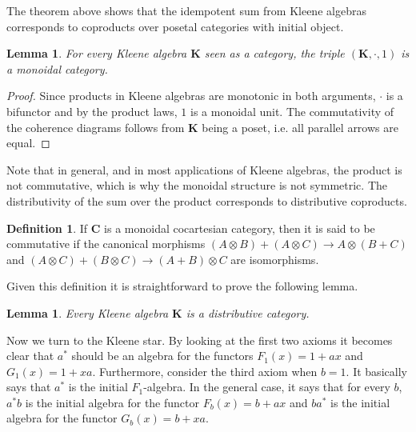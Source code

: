 \documentclass[12pt,a4paper]{article}
\numberwithin{equation}{section}
\newcommand{\cat}{%
\mathbf%
}
\theoremstyle{plain}
\newtheorem{lemma}[theorem]{Lemma}
\theoremstyle{definition}
\newtheorem{definition}[theorem]{Definition}
\begin{document}
The theorem above shows that the idempotent sum from Kleene algebras corresponds to coproducts over posetal categories with initial object.

\begin{lemma}
  For every Kleene algebra $\cat{K}$ seen as a category, the triple $(\cat{K}, \cdot, 1)$ is a monoidal category.
\end{lemma}
\begin{proof}
  Since products in Kleene algebras are monotonic in both arguments, $\cdot$ is a bifunctor and by the product laws, $1$ is a monoidal unit. The commutativity of the coherence diagrams follows from $\cat{K}$ being a poset, i.e. all parallel arrows are equal.
\end{proof}

Note that in general, and in most applications of Kleene algebras, the product is not commutative, which is why the monoidal structure is not symmetric. The distributivity of the sum over the product corresponds to distributive coproducts.

\begin{definition}
  If $\cat{C}$ is a monoidal cocartesian category, then it is said to be commutative if the canonical morphisms $(A \otimes B) + (A \otimes C) \to A \otimes (B + C)$ and
  $(A \otimes C) + (B \otimes C) \to (A + B) \otimes C$ are isomorphisms.
\end{definition}

Given this definition it is straightforward to prove the following lemma.

\begin{lemma}
  Every Kleene algebra $\cat{K}$ is a distributive category.
\end{lemma}

Now we turn to the Kleene star. By looking at the first two axioms it becomes clear that $a^*$ should be an algebra for the functors $F_1(x) = 1 + ax$ and $G_1(x) = 1 + xa$. Furthermore, consider the third axiom when $b = 1$. It basically says that $a^*$ is the initial $F_1$-algebra. In the general case, it says that for every $b$, $a^*b$ is the initial algebra for the functor $F_b(x) = b + ax$ and $ba^*$ is the initial algebra for the functor $G_b(x) = b + xa$.
\end{document}

